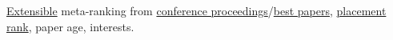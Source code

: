 {\href{https://en.wikipedia.org/wiki/Extensible_programming}{Extensible} meta-ranking from \href{https://dblp.org/}{conference proceedings}/\href{https://jeffhuang.com/best_paper_awards/}{best papers}, \href{https://drafty.cs.brown.edu/csopenrankings/placement-rank.html}{placement rank}, paper age, interests.}
